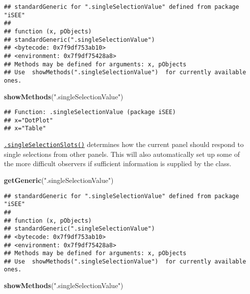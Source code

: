 \documentclass[
]{book}
\newenvironment{Shaded}{\begin{snugshade}}{\end{snugshade}}
\newcommand{\KeywordTok}[1]{\textcolor[rgb]{0.13,0.29,0.53}{\textbf{#1}}}
\newcommand{\NormalTok}[1]{#1}
\newcommand{\StringTok}[1]{\textcolor[rgb]{0.31,0.60,0.02}{#1}}
\begin{document}
\begin{verbatim}
## standardGeneric for ".singleSelectionValue" defined from package "iSEE"
## 
## function (x, pObjects) 
## standardGeneric(".singleSelectionValue")
## <bytecode: 0x7f9df753ab10>
## <environment: 0x7f9df75428a8>
## Methods may be defined for arguments: x, pObjects
## Use  showMethods(".singleSelectionValue")  for currently available ones.
\end{verbatim}

\begin{Shaded}
\begin{Highlighting}[]
\KeywordTok{showMethods}\NormalTok{(}\StringTok{".singleSelectionValue"}\NormalTok{)}
\end{Highlighting}
\end{Shaded}

\begin{verbatim}
## Function: .singleSelectionValue (package iSEE)
## x="DotPlot"
## x="Table"
\end{verbatim}

\href{https://isee.github.io/iSEE/reference/single-select-generics.html}{\texttt{.singleSelectionSlots()}} determines how the current panel should respond to single selections from other panels.
This will also automatically set up some of the more difficult observers if sufficient information is supplied by the class.

\begin{Shaded}
\begin{Highlighting}[]
\KeywordTok{getGeneric}\NormalTok{(}\StringTok{".singleSelectionValue"}\NormalTok{)}
\end{Highlighting}
\end{Shaded}

\begin{verbatim}
## standardGeneric for ".singleSelectionValue" defined from package "iSEE"
## 
## function (x, pObjects) 
## standardGeneric(".singleSelectionValue")
## <bytecode: 0x7f9df753ab10>
## <environment: 0x7f9df75428a8>
## Methods may be defined for arguments: x, pObjects
## Use  showMethods(".singleSelectionValue")  for currently available ones.
\end{verbatim}

\begin{Shaded}
\begin{Highlighting}[]
\KeywordTok{showMethods}\NormalTok{(}\StringTok{".singleSelectionValue"}\NormalTok{)}
\end{Highlighting}
\end{Shaded}
\end{document}
